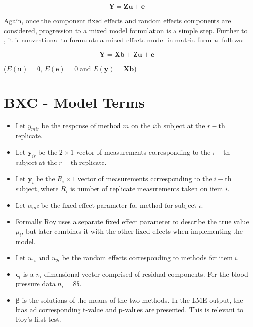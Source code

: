 \documentclass[12pt, a4paper]{report}
\theoremstyle{plain}
\theoremstyle{definition}
\theoremstyle{remark}
\begin{document}
\begin{equation}
\textbf{Y} = \textbf{Zu} + \textbf{e}
\end{equation}

Again, once the component fixed effects and random effects
components are considered, progression to a mixed model
formulation is a simple step. Further to \citet{LW82}, it is
conventional to formulate a mixed effects model in matrix form as
follows:

\begin{equation}
\textbf{Y} = \textbf{Xb} + \textbf{Zu} + \textbf{e}
\end{equation}

($E(\textbf{u})=0$, $E(\textbf{e})=0 $ and $E(\textbf{y}) =
\textbf{Xb}$)


\section{BXC - Model Terms}

\begin{itemize}
	\item Let $y_{mir}$ be the response of method $m$ on the $i$th subject
	at the $r-$th replicate.
	\item Let $\boldsymbol{y}_{ir}$ be the $2 \times 1$ vector of measurements
	corresponding to the $i-$th subject at the $r-$th replicate.
	\item Let $\boldsymbol{y}_{i}$ be the $R_i \times 1$ vector of
	measurements corresponding to the $i-$th subject, where $R_i$ is number of replicate measurements taken on item $i$.
	\item Let $\alpha_mi$ be the fixed effect parameter for method for subject $i$.
	\item Formally Roy uses a separate fixed effect parameter to describe the true value $\mu_i$, but later combines it with the other fixed effects when implementing the model.
	\item Let $u_{1i}$ and $u_{2i}$ be the random effects corresponding to methods for item $i$.
	
	\item $\boldsymbol{\epsilon}_{i}$ is a $n_{i}$-dimensional vector
	comprised of residual components. For the blood pressure data $n_{i} = 85$.
	
	\item $\boldsymbol{\beta}$ is the solutions of the means of the two methods. In the LME output, the bias ad corresponding
	t-value and p-values are presented. This is relevant to Roy's first test.\end{itemize}
\end{document}
